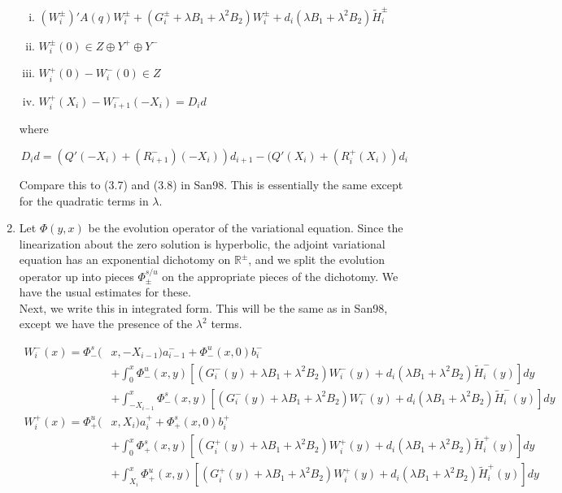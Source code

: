 \documentclass[12pt]{article}
\def\R{{\mathbb R}}
\begin{document}
\begin{enumerate}
\begin{enumerate}[(i)]
\item $(W_i^\pm)' A(q)W_i^\pm + (G_i^\pm + \lambda B_1 + \lambda^2 B_2) W_i^\pm + d_i( \lambda B_1 + \lambda^2 B_2 ) \tilde{H}_i^\pm$
\item $W_i^\pm(0) \in Z \oplus Y^+ \oplus Y^-$
\item $W_i^+(0) - W_i^-(0) \in Z$
\item $W_i^+(X_i) - W_{i+1}^-(-X_i) = D_i d$
\end{enumerate}

where

\begin{equation}
D_i d = (Q'(-X_i) + (R_{i+1}^-)(-X_i))d_{i+1}
- (Q'(X_i) + (R_i^+(X_i))d_i
\end{equation}

Compare this to (3.7) and (3.8) in San98. This is essentially the same except for the quadratic terms in $\lambda$.\\

\item Let $\Phi(y, x)$ be the evolution operator of the variational equation. Since the linearization about the zero solution is hyperbolic, the adjoint variational equation has an exponential dichotomy on $\R^\pm$, and we split the evolution operator up into pieces $\Phi_\pm^{s/u}$ on the appropriate pieces of the dichotomy. We have the usual estimates for these.\\

Next, we write this in integrated form. This will be the same as in San98, except we have the presence of the $\lambda^2$ terms.

\begin{align*}
W_i^-(x) = \Phi_-^s(&x, -X_{i-1})a_{i-1}^- + \Phi_-^u(x, 0)b_i^- \\
&+ \int_0^x \Phi_-^u(x, y)[(G_i^-(y) + \lambda B_1 + \lambda^2 B_2) W_i^-(y) + d_i (\lambda B_1 + \lambda^2 B_2) \tilde{H}_i^-(y) ] dy \\
&+ \int_{-X_{i-1}}^x \Phi_-^s(x, y)[(G_i^-(y) + \lambda B_1 + \lambda^2 B_2) W_i^-(y) + d_i (\lambda B_1 + \lambda^2 B_2) \tilde{H}_i^-(y) ] dy \\
W_i^+(x) = \Phi_+^u(&x, X_i)a_i^+ + \Phi_+^s(x, 0)b_i^+ \\
&+ \int_0^x \Phi_+^s(x, y)[(G_i^+(y) + \lambda B_1 + \lambda^2 B_2) W_i^+(y) + d_i (\lambda B_1 + \lambda^2 B_2) \tilde{H}_i^+(y) ] dy \\
&+ \int_{X_i}^x \Phi_+^u(x, y) [(G_i^+(y) + \lambda B_1 + \lambda^2 B_2) W_i^+(y) + d_i (\lambda B_1 + \lambda^2 B_2) \tilde{H}_i^+(y) ] dy
\end{align*}


\end{enumerate}
\end{document}
